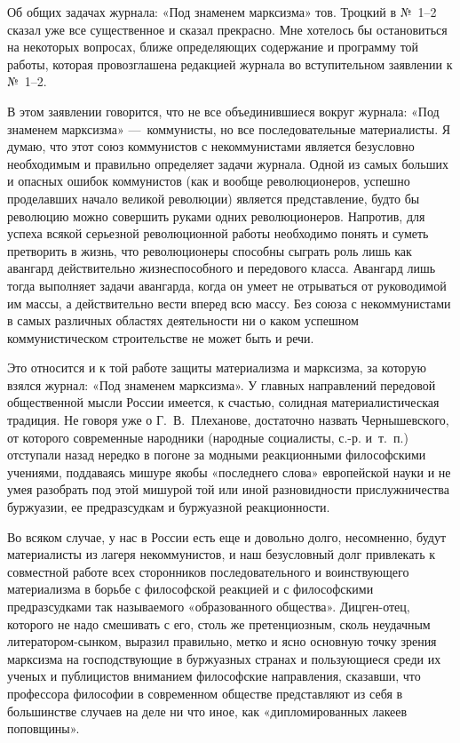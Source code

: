 Об общих задачах журнала: «Под знаменем марксизма» тов. Троцкий в №~1–2
сказал уже все существенное и сказал прекрасно. Мне хотелось бы
остановиться на некоторых вопросах, ближе определяющих содержание и
программу той работы, которая провозглашена редакцией журнала во
вступительном заявлении к №~1–2.

В этом заявлении говорится, что не все объединившиеся вокруг журнала: «Под
знаменем марксизма» —~коммунисты, но все последовательные материалисты. Я
думаю, что этот союз коммунистов с некоммунистами является безусловно
необходимым и правильно определяет задачи журнала. Одной из самых больших и
опасных ошибок коммунистов (как и вообще революционеров, успешно
проделавших начало великой революции) является представление, будто бы
революцию можно совершить руками одних революционеров. Напротив, для успеха
всякой серьезной революционной работы необходимо понять и суметь претворить
в жизнь, что революционеры способны сыграть роль лишь как авангард
действительно жизнеспособного и передового класса. Авангард лишь тогда
выполняет задачи авангарда, когда он умеет не отрываться от руководимой им
массы, а действительно вести вперед всю массу. Без союза с некоммунистами в
самых различных областях деятельности ни о каком успешном коммунистическом
строительстве не может быть и речи.

Это относится и к той работе защиты материализма и марксизма, за которую
взялся журнал: «Под знаменем марксизма». У главных направлений передовой
общественной мысли России имеется, к счастью, солидная материалистическая
традиция. Не говоря уже о
Г.~В.~Плеханове, достаточно назвать
Чернышевского, от которого современные народники (народные социалисты,
с.-р. и~т.~п.) отступали назад нередко в погоне за модными реакционными
философскими учениями, поддаваясь мишуре якобы «последнего слова»
европейской науки и не умея разобрать под этой мишурой той или иной
разновидности прислужничества буржуазии, ее предразсудкам и буржуазной
реакционности.

Во всяком случае, у нас в России есть еще и довольно долго, несомненно,
будут материалисты из лагеря некоммунистов, и наш безусловный долг
привлекать к совместной работе всех сторонников последовательного и
воинствующего материализма в борьбе с философской реакцией и с философскими
предразсудками так называемого «образованного общества». Дицген-отец,
которого не надо смешивать с его, столь же претенциозным, сколь неудачным
литератором-сынком, выразил правильно, метко и ясно основную точку зрения
марксизма на господствующие в буржуазных странах и пользующиеся среди их
ученых и публицистов вниманием философские направления, сказавши, что
профессора философии в современном обществе представляют из себя в
большинстве случаев на деле ни что иное, как «дипломированных лакеев
поповщины».

